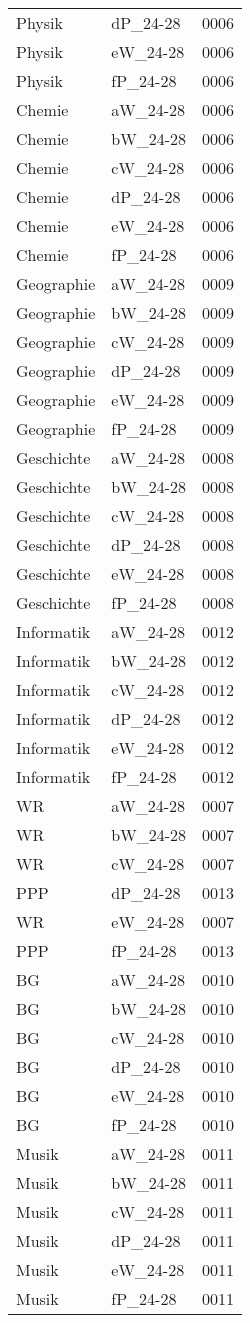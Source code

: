 \documentclass{standalone}
\begin{document}
\begin{tabular}{|l|l|l|}
    Physik&dP\_24-28&0006\\
    Physik&eW\_24-28&0006\\
    Physik&fP\_24-28&0006\\
    Chemie&aW\_24-28&0006\\
    Chemie&bW\_24-28&0006\\
    Chemie&cW\_24-28&0006\\
    Chemie&dP\_24-28&0006\\
    Chemie&eW\_24-28&0006\\
    Chemie&fP\_24-28&0006\\
    Geographie&aW\_24-28&0009\\
    Geographie&bW\_24-28&0009\\
    Geographie&cW\_24-28&0009\\
    Geographie&dP\_24-28&0009\\
    Geographie&eW\_24-28&0009\\
    Geographie&fP\_24-28&0009\\
    Geschichte&aW\_24-28&0008\\
    Geschichte&bW\_24-28&0008\\
    Geschichte&cW\_24-28&0008\\
    Geschichte&dP\_24-28&0008\\
    Geschichte&eW\_24-28&0008\\
    Geschichte&fP\_24-28&0008\\
    Informatik&aW\_24-28&0012\\
    Informatik&bW\_24-28&0012\\
    Informatik&cW\_24-28&0012\\
    Informatik&dP\_24-28&0012\\
    Informatik&eW\_24-28&0012\\
    Informatik&fP\_24-28&0012\\
    WR&aW\_24-28&0007\\
    WR&bW\_24-28&0007\\
    WR&cW\_24-28&0007\\
    PPP&dP\_24-28&0013\\
    WR&eW\_24-28&0007\\
    PPP&fP\_24-28&0013\\
    BG&aW\_24-28&0010\\
    BG&bW\_24-28&0010\\
    BG&cW\_24-28&0010\\
    BG&dP\_24-28&0010\\
    BG&eW\_24-28&0010\\
    BG&fP\_24-28&0010\\
    Musik&aW\_24-28&0011\\
    Musik&bW\_24-28&0011\\
    Musik&cW\_24-28&0011\\
    Musik&dP\_24-28&0011\\
    Musik&eW\_24-28&0011\\
    Musik&fP\_24-28&0011\\
    \hline
    \end{tabular}
\end{document}
